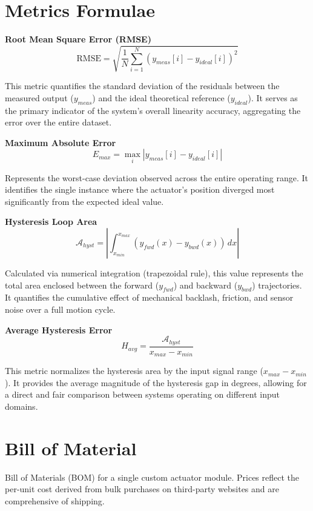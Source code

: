 \newpage
\section{Metrics Formulae}
\label{app:metrics}

\textbf{Root Mean Square Error (RMSE)}
$$\text{RMSE} = \sqrt{ \frac{1}{N} \sum_{i=1}^{N} \left( y_{meas}[i] - y_{ideal}[i] \right)^2 }$$

This metric quantifies the standard deviation of the residuals between the measured output ($y_{meas}$) and the ideal
theoretical reference ($y_{ideal}$). It serves as the primary indicator of the system's overall linearity accuracy,
aggregating the error over the entire dataset.


\textbf{Maximum Absolute Error}
$$E_{max} = \max_{i} \left| y_{meas}[i] - y_{ideal}[i] \right|$$

Represents the worst-case deviation observed across the entire operating range. It identifies the single instance
where the actuator's position diverged most significantly from the expected ideal value.


\textbf{Hysteresis Loop Area}
$$\mathcal{A}_{hyst} = \left| \int_{x_{min}}^{x_{max}} \left( y_{fwd}(x) - y_{bwd}(x) \right) \, dx \right|$$

Calculated via numerical integration (trapezoidal rule), this value represents the total area enclosed between the
forward ($y_{fwd}$) and backward ($y_{bwd}$) trajectories. It quantifies the cumulative effect of mechanical backlash,
friction, and sensor noise over a full motion cycle.


\textbf{Average Hysteresis Error}
$$H_{avg} = \frac{\mathcal{A}_{hyst}}{x_{max} - x_{min}}$$

This metric normalizes the hysteresis area by the input signal range ($x_{max} - x_{min}$). It provides the average
magnitude of the hysteresis gap in degrees, allowing for a direct and fair comparison between systems operating on
different input domains.


\newpage
\section{Bill of Material}
\label{app:bom}

Bill of Materials (BOM) for a single custom actuator module. Prices reflect the per-unit cost derived from bulk purchases
on third-party websites and are comprehensive of shipping.


